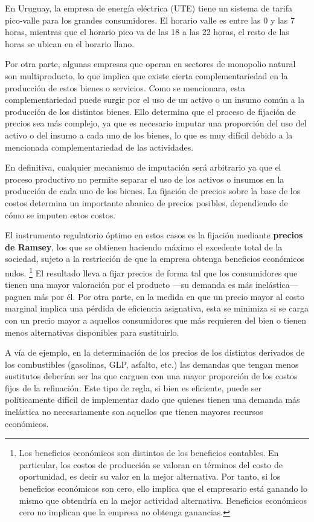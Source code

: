 \documentclass[
  12pt,
  spanish,
]{book}
\begin{document}
En Uruguay, la empresa de energía eléctrica (UTE) tiene un sistema de
tarifa pico-valle para los grandes consumidores. El horario valle es
entre las 0 y las 7 horas, mientras que el horario pico va de las 18 a
las 22 horas, el resto de las horas se ubican en el horario llano.

Por otra parte, algunas empresas que operan en sectores de monopolio
natural son multiproducto, lo que implica que existe cierta
complementariedad en la producción de estos bienes o servicios. Como se
mencionara, esta complementariedad puede surgir por el uso de un activo
o un insumo común a la producción de los distintos bienes. Ello
determina que el proceso de fijación de precios sea más complejo, ya que
es necesario imputar una proporción del uso del activo o del insumo a
cada uno de los bienes, lo que es muy difícil debido a la mencionada
complementariedad de las actividades.

En definitiva, cualquier mecanismo de imputación será arbitrario ya que
el proceso productivo no permite separar el uso de los activos o insumos
en la producción de cada uno de los bienes. La fijación de precios sobre
la base de los costos determina un importante abanico de precios
posibles, dependiendo de cómo se imputen estos costos.

El instrumento regulatorio óptimo en estos casos es la fijación mediante
\textbf{precios de Ramsey}, los que se obtienen haciendo máximo el
excedente total de la sociedad, sujeto a la restricción de que la
empresa obtenga beneficios económicos nulos. \footnote{Los beneficios
  económicos son distintos de los beneficios contables. En particular,
  los costos de producción se valoran en términos del costo de
  oportunidad, es decir su valor en la mejor alternativa. Por tanto, si
  los beneficios económicos son cero, ello implica que el empresario
  está ganando lo mismo que obtendría en la mejor actividad alternativa.
  Beneficios económicos cero no implican que la empresa no obtenga
  ganancias.} El resultado lleva a fijar precios de forma tal que los
consumidores que tienen una mayor valoración por el producto ---su
demanda es más inelástica--- paguen más por él. Por otra parte, en la
medida en que un precio mayor al costo marginal implica una pérdida de
eficiencia asignativa, esta se minimiza si se carga con un precio mayor
a aquellos consumidores que más requieren del bien o tienen menos
alternativas disponibles para sustituirlo.

A vía de ejemplo, en la determinación de los precios de los distintos
derivados de los combustibles (gasolinas, GLP, asfalto, etc.) las
demandas que tengan menos sustitutos deberían ser las que carguen con
una mayor proporción de los costos fijos de la refinación. Este tipo de
regla, si bien es eficiente, puede ser políticamente difícil de
implementar dado que quienes tienen una demanda más inelástica no
necesariamente son aquellos que tienen mayores recursos económicos.
\end{document}
